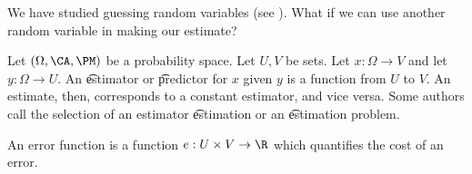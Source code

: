 

We have studied guessing random variables (see ).
What if we can use another random variable in making our estimate?


Let $(\Omega, \CA, \PM)$ be a probability space.
Let $U, V$ be sets.
Let $x: \Omega \to V$ and let $y: \Omega \to U$.
An \t{estimator} or \t{predictor} for $x$ given $y$ is a function from $U$ to $V$.
An estimate, then, corresponds to a constant estimator, and vice versa.
Some authors call the selection of an estimator \t{estimation} or an \t{estimation problem}.


An error function is a function $e: U \times V \to \R$ which quantifies the cost of an error.




\blankpage
